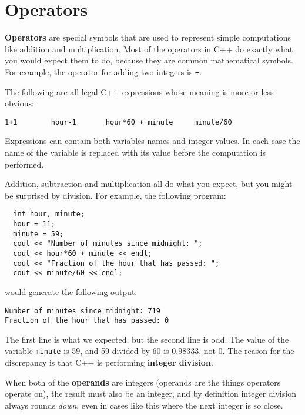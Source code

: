 \section{Operators}

{\bf Operators} are special symbols that are used to represent
simple computations like addition and multiplication.  Most
of the operators in C++ do exactly what you would expect them
to do, because they are common mathematical symbols.  For
example, the operator for adding two integers is {\tt +}.

The following are all legal C++ expressions whose meaning is
more or less obvious:

\begin{lstlisting}
1+1        hour-1       hour*60 + minute     minute/60
\end{lstlisting}
%
Expressions can contain both variables
names and integer values.  In each case the name of the variable is
replaced with its value before the computation is performed.


Addition, subtraction and multiplication all do what you
expect, but you might be surprised by division.  For example,
the following program:

\begin{lstlisting}
  int hour, minute;
  hour = 11;
  minute = 59;
  cout << "Number of minutes since midnight: ";
  cout << hour*60 + minute << endl;
  cout << "Fraction of the hour that has passed: ";
  cout << minute/60 << endl;
\end{lstlisting}
%
would generate the following output:

\begin{lstlisting}
Number of minutes since midnight: 719
Fraction of the hour that has passed: 0
\end{lstlisting}
%
The first line is what we expected, but the second line is
odd.  The value of the variable {\tt minute} is 59, and
59 divided by 60 is 0.98333, not 0.  The reason for the
discrepancy is that C++ is performing {\bf integer division}.


When both of the {\bf operands} are integers (operands are the things
operators operate on), the result must also be an integer,
and by definition integer division always rounds {\em down},
even in cases like this where the next integer is so close.

